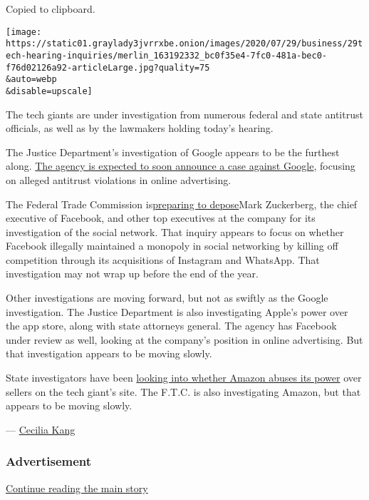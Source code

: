 Copied to clipboard.

\texttt{[image: https://static01.graylady3jvrrxbe.onion/images/2020/07/29/business/29tech-hearing-inquiries/merlin\_163192332\_bc0f35e4-7fc0-481a-bec0-f76d02126a92-articleLarge.jpg?quality=75\\\&auto=webp\\\&disable=upscale]}

The tech giants are under investigation from numerous federal and state
antitrust officials, as well as by the lawmakers holding today's
hearing.

The Justice Department's investigation of Google appears to be the
furthest along.
\href{https://www.nytimes3xbfgragh.onion/2020/06/25/technology/barr-google-investigation.html}{The
agency is expected to soon announce a case against Google}, focusing on
alleged antitrust violations in online advertising.

The Federal Trade Commission
is\href{https://www.nytimes3xbfgragh.onion/2020/07/17/technology/ftc-facebook-investigation.html}{preparing
to depose}Mark Zuckerberg, the chief executive of Facebook, and other
top executives at the company for its investigation of the social
network. That inquiry appears to focus on whether Facebook illegally
maintained a monopoly in social networking by killing off competition
through its acquisitions of Instagram and WhatsApp. That investigation
may not wrap up before the end of the year.

Other investigations are moving forward, but not as swiftly as the
Google investigation. The Justice Department is also investigating
Apple's power over the app store, along with state attorneys general.
The agency has Facebook under review as well, looking at the company's
position in online advertising. But that investigation appears to be
moving slowly.

State investigators have been
\href{https://www.nytimes3xbfgragh.onion/2020/06/12/technology/state-inquiry-antitrust-amazon.html}{looking
into whether Amazon abuses its power} over sellers on the tech giant's
site. The F.T.C. is also investigating Amazon, but that appears to be
moving slowly.

--- \href{https://www.nytimes3xbfgragh.onion/by/cecilia-kang}{Cecilia
Kang}

\hypertarget{advertisement-2}{%
\subsubsection{Advertisement}\label{advertisement-2}}

\protect\hyperlink{after-dfp-ad-mid3}{Continue reading the main story}

